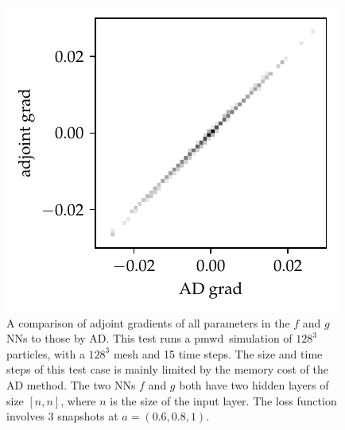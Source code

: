 \documentclass[modern, trackchanges, dvipsnames]{aastex631}
\newcommand{\pmwd}{{\usefont{T1}{nova}{m}{sl}pmwd}}
\begin{document}
\begin{figure}
  \centering
  \includegraphics[width=0.5\linewidth]{nn_grads_cmp.pdf}
  \caption{A comparison of adjoint gradients of all parameters in the
  $f$ and $g$ NNs to those by AD.
  This test runs a \pmwd\ simulation of $128^3$ particles, with a
  $128^3$ mesh and 15 time steps.
  The size and time steps of this test case is mainly limited by the
  memory cost of the AD method.
  The two NNs $f$ and $g$ both have two hidden layers of size $[n, n]$,
  where $n$ is the size of the input layer.
  The loss function involves 3 snapshots at $a=(0.6, 0.8, 1)$.
  }
  \label{fig:nn_grads_cmp}
\end{figure}


\end{document}
